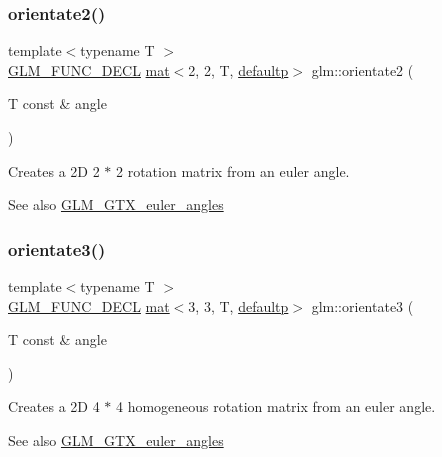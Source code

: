 \subsubsection{\texorpdfstring{orientate2()}{orientate2()}}
{\footnotesize\ttfamily template$<$typename T $>$ \\
\mbox{\hyperlink{setup_8hpp_ab2d052de21a70539923e9bcbf6e83a51}{G\+L\+M\+\_\+\+F\+U\+N\+C\+\_\+\+D\+E\+CL}} \mbox{\hyperlink{structglm_1_1mat}{mat}}$<$2, 2, T, \mbox{\hyperlink{namespaceglm_a36ed105b07c7746804d7fdc7cc90ff25a9d21ccd8b5a009ec7eb7677befc3bf51}{defaultp}}$>$ glm\+::orientate2 (\begin{DoxyParamCaption}\item[{T const \&}]{angle }\end{DoxyParamCaption})}

Creates a 2D 2 $\ast$ 2 rotation matrix from an euler angle. \begin{DoxySeeAlso}{See also}
\mbox{\hyperlink{group__gtx__euler__angles}{G\+L\+M\+\_\+\+G\+T\+X\+\_\+euler\+\_\+angles}} 
\end{DoxySeeAlso}
\mbox{\label{group__gtx__euler__angles_ga7ca98668a5786f19c7b38299ebbc9b4c}} 
\subsubsection{\texorpdfstring{orientate3()}{orientate3()}\hspace{0.1cm}{\footnotesize\ttfamily [1/2]}}
{\footnotesize\ttfamily template$<$typename T $>$ \\
\mbox{\hyperlink{setup_8hpp_ab2d052de21a70539923e9bcbf6e83a51}{G\+L\+M\+\_\+\+F\+U\+N\+C\+\_\+\+D\+E\+CL}} \mbox{\hyperlink{structglm_1_1mat}{mat}}$<$3, 3, T, \mbox{\hyperlink{namespaceglm_a36ed105b07c7746804d7fdc7cc90ff25a9d21ccd8b5a009ec7eb7677befc3bf51}{defaultp}}$>$ glm\+::orientate3 (\begin{DoxyParamCaption}\item[{T const \&}]{angle }\end{DoxyParamCaption})}

Creates a 2D 4 $\ast$ 4 homogeneous rotation matrix from an euler angle. \begin{DoxySeeAlso}{See also}
\mbox{\hyperlink{group__gtx__euler__angles}{G\+L\+M\+\_\+\+G\+T\+X\+\_\+euler\+\_\+angles}} 
\end{DoxySeeAlso}
\mbox{\label{group__gtx__euler__angles_ga7238c8e15c7720e3ca6a45ab151eeabb}} 
